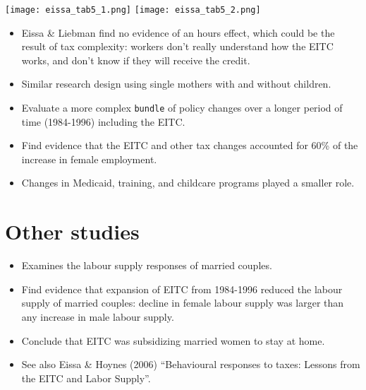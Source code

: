 \documentclass[
  letterpaper,
  DIV=11,
  numbers=noendperiod]{scrreprt}
\providecommand{\tightlist}{%
  \setlength{\itemsep}{0pt}\setlength{\parskip}{0pt}}\usepackage{longtable,booktabs,array}
\theoremstyle{definition}
\theoremstyle{remark}
\begin{document}
\texttt{[image: eissa\_tab5\_1.png]}
\texttt{[image: eissa\_tab5\_2.png]}

\begin{itemize}
\tightlist
\item
  Eissa \& Liebman find no evidence of an hours effect, which could be
  the result of tax complexity: workers don't really understand how the
  EITC works, and don't know if they will receive the credit.
\end{itemize}

\begin{tcolorbox}[enhanced jigsaw, bottomrule=.15mm, coltitle=black, arc=.35mm, left=2mm, opacityback=0, leftrule=.75mm, colbacktitle=quarto-callout-note-color!10!white, title={Meyer \& Rosenbaum (2001)}, toprule=.15mm, bottomtitle=1mm, breakable, colframe=quarto-callout-note-color-frame, opacitybacktitle=0.6, titlerule=0mm, colback=white, rightrule=.15mm, toptitle=1mm]

\begin{itemize}
\tightlist
\item
  Similar research design using single mothers with and without
  children.
\item
  Evaluate a more complex \texttt{bundle} of policy changes over a
  longer period of time (1984-1996) including the EITC.
\item
  Find evidence that the EITC and other tax changes accounted for 60\%
  of the increase in female employment.
\item
  Changes in Medicaid, training, and childcare programs played a smaller
  role.
\end{itemize}

\end{tcolorbox}

\section{Other studies}\label{other-studies}

\begin{tcolorbox}[enhanced jigsaw, bottomrule=.15mm, coltitle=black, arc=.35mm, left=2mm, opacityback=0, leftrule=.75mm, colbacktitle=quarto-callout-note-color!10!white, title={Eissa \& Hoynes (JPub, 2004)}, toprule=.15mm, bottomtitle=1mm, breakable, colframe=quarto-callout-note-color-frame, opacitybacktitle=0.6, titlerule=0mm, colback=white, rightrule=.15mm, toptitle=1mm]

\begin{itemize}
\tightlist
\item
  Examines the labour supply responses of married couples.
\item
  Find evidence that expansion of EITC from 1984-1996 reduced the labour
  supply of married couples: decline in female labour supply was larger
  than any increase in male labour supply.
\item
  Conclude that EITC was subsidizing married women to stay at home.
\item
  See also Eissa \& Hoynes (2006) ``Behavioural responses to taxes:
  Lessons from the EITC and Labor Supply''.
\end{itemize}

\end{tcolorbox}
\end{document}
